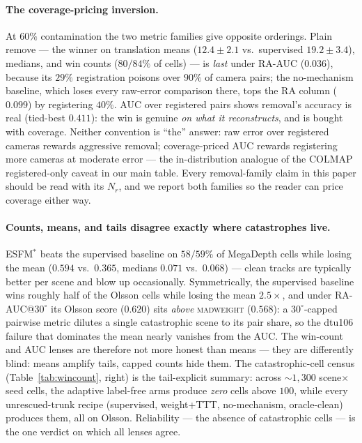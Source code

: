\documentclass[10pt,twocolumn,letterpaper]{article}
\newcommand{\mad}{\textsc{madweight}}
\begin{document}
\paragraph{The coverage-pricing inversion.} At $60\%$ contamination the two metric
families give opposite orderings. Plain remove --- the winner on translation means
($12.4\pm2.1$ vs.\ supervised $19.2\pm3.4$), medians, and win counts ($80/84\%$ of
cells) --- is \emph{last} under RA-AUC ($0.036$), because its $29\%$ registration
poisons over $90\%$ of camera pairs; the no-mechanism baseline, which loses every
raw-error comparison there, tops the RA column ($0.099$) by registering $40\%$.
AUC over registered pairs shows removal's accuracy is real (tied-best $0.411$): the
win is genuine \emph{on what it reconstructs}, and is bought with coverage. Neither
convention is ``the'' answer: raw error over registered cameras rewards aggressive
removal; coverage-priced AUC rewards registering more cameras at moderate error ---
the in-distribution analogue of the COLMAP registered-only caveat in our main table.
Every removal-family claim in this paper should be read with its $N_r$, and we
report both families so the reader can price coverage either way.

\paragraph{Counts, means, and tails disagree exactly where catastrophes live.}
ESFM$^{\ast}$ beats the supervised baseline on $58/59\%$ of MegaDepth cells while
losing the mean ($0.594$ vs.\ $0.365$, medians $0.071$ vs.\ $0.068$) --- clean tracks
are typically better per scene and blow up occasionally. Symmetrically, the supervised
baseline wins roughly half of the Olsson cells while losing the mean $2.5\times$, and
under RA-AUC@$30^{\circ}$ its Olsson score ($0.620$) sits \emph{above} \mad{}
($0.568$): a $30^{\circ}$-capped pairwise metric dilutes a single catastrophic scene
to its pair share, so the dtu106 failure that dominates the mean nearly vanishes from
the AUC. The win-count and AUC lenses are therefore not more honest than means ---
they are differently blind: means amplify tails, capped counts hide them. The
catastrophic-cell census (Table~\ref{tab:wincount}, right) is the tail-explicit
summary: across ${\sim}1{,}300$ scene$\times$seed cells, the adaptive label-free arms
produce \emph{zero} cells above $100$, while every unrescued-trunk recipe (supervised,
weight+TTT, no-mechanism, oracle-clean) produces them, all on Olsson. Reliability ---
the absence of catastrophic cells --- is the one verdict on which all lenses agree.
\end{document}
